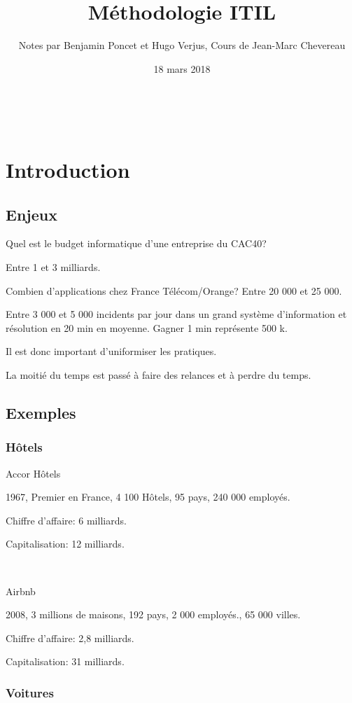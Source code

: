\documentclass[a4paper,11pt]{article}
\title{Méthodologie ITIL}
\author{Notes par Benjamin Poncet et Hugo Verjus, Cours de Jean-Marc Chevereau}
\date{18 mars 2018}
\newcommand{\euro}{\texteuro}
\begin{document}
\maketitle
\tableofcontents

\

\section{Introduction}

\subsection{Enjeux}

Quel est le budget informatique d'une entreprise du CAC40?

Entre 1 et 3 milliards.

Combien d'applications chez France Télécom/Orange? Entre 20 000 et 25 000.

Entre 3 000 et 5 000 incidents par jour dans un grand système d'information et
résolution en 20 min en moyenne. Gagner 1 min représente 500 k\euro .

Il est donc important d'uniformiser les pratiques.

La moitié du temps est passé à faire des relances et à perdre du temps.

\subsection{Exemples}

\subsubsection{Hôtels}

Accor Hôtels

1967, Premier en France, 4 100 Hôtels, 95 pays, 240 000 employés.

Chiffre d'affaire: 6 milliards.

Capitalisation: 12 milliards.

\

Airbnb

2008, 3 millions de maisons, 192 pays, 2 000 employés., 65 000 villes.

Chiffre d'affaire: 2,8 milliards.

Capitalisation: 31 milliards.

\subsubsection{Voitures}
\end{document}
